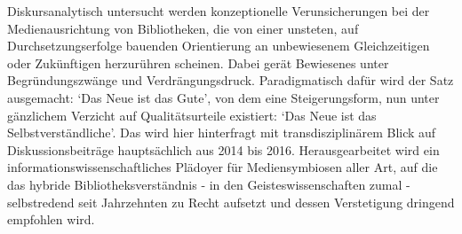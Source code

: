 Diskursanalytisch untersucht werden konzeptionelle Verunsicherungen bei
der Medienausrichtung von Bibliotheken, die von einer unsteten, auf
Durchsetzungserfolge bauenden Orientierung an unbewiesenem
Gleichzeitigen oder Zukünftigen herzurühren scheinen. Dabei gerät
Bewiesenes unter Begründungszwänge und Verdrängungsdruck. Paradigmatisch
dafür wird der Satz ausgemacht: `Das Neue ist das Gute', von dem eine
Steigerungsform, nun unter gänzlichem Verzicht auf Qualitätsurteile
existiert: `Das Neue ist das Selbstverständliche'. Das wird hier
hinterfragt mit transdisziplinärem Blick auf Diskussionsbeiträge
hauptsächlich aus 2014 bis 2016. Herausgearbeitet wird ein
informationswissenschaftliches Plädoyer für Mediensymbiosen aller Art,
auf die das hybride Bibliotheksverständnis - in den
Geisteswissenschaften zumal - selbstredend seit Jahrzehnten zu Recht
aufsetzt und dessen Verstetigung dringend empfohlen wird.
